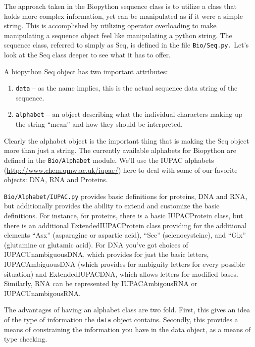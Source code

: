 \documentclass{report}
\begin{document}
The approach taken in the Biopython sequence class is to utilize a class that holds more complex information, yet can be manipulated as if it were a simple string. This is accomplished by utilizing operator overloading to make manipulating a sequence object feel like manipulating a python string. The sequence class, referred to simply as Seq,  is defined in the file \verb|Bio/Seq.py.| Let's look at the Seq class deeper to see what it has to offer.


A biopython Seq object has two important attributes:

\begin{enumerate}

\item \verb|data| -- as the name implies, this is the actual sequence data string of the sequence.

\item \verb|alphabet| -- an object describing what the individual characters making up the string ``mean'' and how they should be interpreted.

\end{enumerate}

Clearly the alphabet object is the important thing that is making the Seq object more than just a string. The currently available alphabets for Biopython are defined in the \verb|Bio/Alphabet| module. We'll use the IUPAC alphabets \ahrefurl ({\url{http://www.chem.qmw.ac.uk/iupac/}}) here to deal with some of our favorite objects: DNA, RNA and Proteins.  


\verb|Bio/Alphabet/IUPAC.py| provides basic definitions for proteins, DNA and RNA, but additionally provides the ability to extend and customize the basic definitions. For instance, for proteins, there is a basic IUPACProtein class, but there is an additional ExtendedIUPACProtein class providing for the additional elements ``Asx'' (asparagine or aspartic acid), ``Sec'' (selenocysteine), and ``Glx'' (glutamine or glutamic acid). For DNA you've got choices of IUPACUnambiguousDNA, which provides for just the basic letters, IUPACAmbiguousDNA (which provides for ambiguity letters for every possible situation) and ExtendedIUPACDNA, which allows letters for modified bases. Similarly, RNA can be represented by IUPACAmbigousRNA or IUPACUnambigousRNA.


The advantages of having an alphabet class are two fold. First, this gives an idea of the type of information the \verb|data| object contains. Secondly, this provides a means of constraining the information you have in the data object, as a means of type checking.
\end{document}
